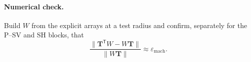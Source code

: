 \documentclass[11pt,a4paper]{article}
\newcommand{\bT}{\mathbf{T}}
\begin{document}
\paragraph{Numerical check.} Build $W$ from the explicit arrays at a
test radius and confirm, separately for the P--SV and SH blocks, that
\begin{equation}
  \frac{\lVert \bT^{\mathsf T} W - W \bT \rVert}{\lVert W \bT \rVert}
  \approx \varepsilon_{\mathrm{mach}} .
  \label{eq:check}
\end{equation}


\end{document}
